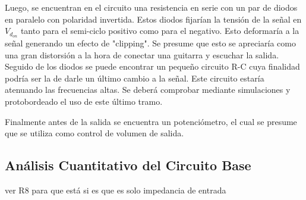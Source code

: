 Luego, se encuentran en el circuito una resistencia en serie con un par de diodos en paralelo con polaridad invertida. Estos diodos fijarían la tensión de la señal en $V_{d_{on}}$ tanto para el semi-ciclo positivo como para el negativo. Esto deformaría a la señal generando un efecto de "clipping". Se presume que esto se apreciaría como una gran distorsión a la hora de conectar una guitarra y escuchar la salida.\\

Seguido de los diodos se puede encontrar un pequeño circuito R-C cuya finalidad podría ser la de darle un último cambio a la señal. Este circuito estaría atenuando las frecuencias altas. Se deberá comprobar mediante simulaciones y protobordeado el uso de este último tramo.

Finalmente antes de la salida se encuentra un potenciómetro, el cual se presume que se utiliza como control de volumen de salida.

\subsection{Análisis Cuantitativo del Circuito Base}

\large{ver R8 para que está si es que es solo impedancia de entrada}

 

